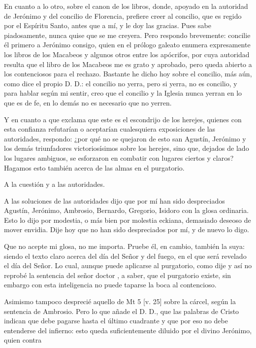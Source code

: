 En cuanto a lo otro, sobre el canon de los libros, donde, apoyado en la autoridad de Jerónimo y del concilio de Florencia, prefiere creer al concilio, que es regido por el Espíritu Santo, antes que a mí, y le doy las gracias. Pues sabe piadosamente, nunca quise que se me creyera. Pero respondo brevemente: concilie él primero a Jerónimo consigo, quien en el prólogo galeato enumera expresamente los libros de los Macabeos y algunos otros entre los apócrifos, por cuya autoridad resulta que el libro de los Macabeos me es grato y aprobado, pero queda abierto a los contenciosos para el rechazo. Bastante he dicho hoy sobre el concilio, más aún, como dice el propio D. D.: el concilio no yerra, pero si yerra, no es concilio, y para hablar según mi sentir, creo que el concilio y la Iglesia nunca yerran en lo que es de fe, en lo demás no es necesario que no yerren.

Y en cuanto a que exclama que este es el escondrijo de los herejes, quienes con esta confianza refutarían o aceptarían cualesquiera exposiciones de las autoridades, respondo: ¿por qué no se quejaron de esto san Agustín, Jerónimo y los demás triunfadores victoriosísimos sobre los herejes, sino que, dejados de lado los lugares ambiguos, se esforzaron en combatir con lugares ciertos y claros? Hagamos esto también acerca de las almas en el purgatorio.

A la cuestión y a las autoridades.

A las soluciones de las autoridades dijo que por mí han sido despreciados Agustín, Jerónimo, Ambrosio, Bernardo, Gregorio, Isidoro con la glosa ordinaria. Esto lo dijo por modestia, o más bien por molestia eckiana, demasiado deseoso de mover envidia. Dije hoy que no han sido despreciados por mí, y de nuevo lo digo.

Que no acepte mi glosa, no me importa. Pruebe él, en cambio, también la suya: siendo el texto claro acerca del día del Señor y del fuego, en el que será revelado el día del Señor. Lo cual, aunque puede aplicarse al purgatorio, como dije y así no reprobé la sentencia del señor doctor \marginpar{\small[340]}, a saber, que el purgatorio existe, sin embargo con esta inteligencia no puede taparse la boca al contencioso.

Asimismo tampoco desprecié aquello de Mt 5 [v. 25] sobre la cárcel, según la sentencia de Ambrosio. Pero lo que añade el D. D., que las palabras de Cristo indican que debe pagarse hasta el último cuadrante y que por eso no debe entenderse del infierno: esto queda suficientemente diluido por el divino Jerónimo, quien contra

